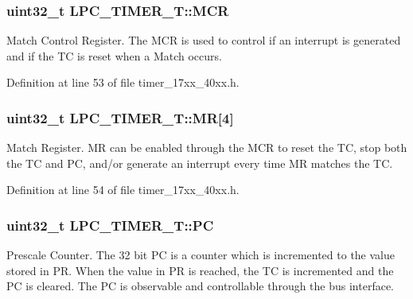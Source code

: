 \subsubsection[{\texorpdfstring{M\+CR}{MCR}}]{ uint32\+\_\+t L\+P\+C\+\_\+\+T\+I\+M\+E\+R\+\_\+\+T\+::\+M\+CR}\hypertarget{structLPC__TIMER__T_a7696d9896a932a78d6a6a60488332674}{}\label{structLPC__TIMER__T_a7696d9896a932a78d6a6a60488332674}
Match Control Register. The M\+CR is used to control if an interrupt is generated and if the TC is reset when a Match occurs. 

Definition at line 53 of file timer\+\_\+17xx\+\_\+40xx.\+h.

\subsubsection[{\texorpdfstring{MR}{MR}}]{ uint32\+\_\+t L\+P\+C\+\_\+\+T\+I\+M\+E\+R\+\_\+\+T\+::\+MR\mbox{[}4\mbox{]}}\hypertarget{structLPC__TIMER__T_a26e8addd98189542175c5ecbcd8d3776}{}\label{structLPC__TIMER__T_a26e8addd98189542175c5ecbcd8d3776}
Match Register. MR can be enabled through the M\+CR to reset the TC, stop both the TC and PC, and/or generate an interrupt every time MR matches the TC. 

Definition at line 54 of file timer\+\_\+17xx\+\_\+40xx.\+h.

\subsubsection[{\texorpdfstring{PC}{PC}}]{ uint32\+\_\+t L\+P\+C\+\_\+\+T\+I\+M\+E\+R\+\_\+\+T\+::\+PC}\hypertarget{structLPC__TIMER__T_aff47df94f3c3f882c742af874983ffb9}{}\label{structLPC__TIMER__T_aff47df94f3c3f882c742af874983ffb9}
Prescale Counter. The 32 bit PC is a counter which is incremented to the value stored in PR. When the value in PR is reached, the TC is incremented and the PC is cleared. The PC is observable and controllable through the bus interface. 

